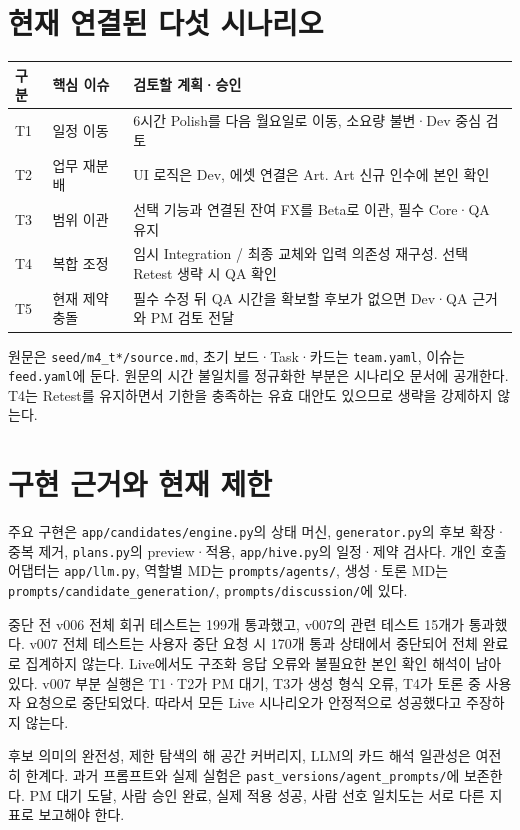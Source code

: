 \documentclass[11pt,a4paper]{article}
\begin{document}
\section{현재 연결된 다섯 시나리오}
\begin{tabularx}{\linewidth}{@{}p{13mm}p{30mm}Y@{}}\toprule
구분 & 핵심 이슈 & 검토할 계획·승인\\\midrule
T1 & 일정 이동 & 6시간 Polish를 다음 월요일로 이동, 소요량 불변·Dev 중심 검토\\
T2 & 업무 재분배 & UI 로직은 Dev, 에셋 연결은 Art. Art 신규 인수에 본인 확인\\
T3 & 범위 이관 & 선택 기능과 연결된 잔여 FX를 Beta로 이관, 필수 Core·QA 유지\\
T4 & 복합 조정 & 임시 Integration / 최종 교체와 입력 의존성 재구성. 선택 Retest 생략 시 QA 확인\\
T5 & 현재 제약 충돌 & 필수 수정 뒤 QA 시간을 확보할 후보가 없으면 Dev·QA 근거와 PM 검토 전달\\\bottomrule
\end{tabularx}
원문은 \texttt{seed/m4\_t*/source.md}, 초기 보드·Task·카드는 \texttt{team.yaml}, 이슈는 \texttt{feed.yaml}에 둔다. 원문의 시간 불일치를 정규화한 부분은 시나리오 문서에 공개한다. T4는 Retest를 유지하면서 기한을 충족하는 유효 대안도 있으므로 생략을 강제하지 않는다.

\section{구현 근거와 현재 제한}
주요 구현은 \texttt{app/candidates/engine.py}의 상태 머신, \texttt{generator.py}의 후보 확장·중복 제거, \texttt{plans.py}의 preview·적용, \texttt{app/hive.py}의 일정·제약 검사다. 개인 호출 어댑터는 \texttt{app/llm.py}, 역할별 MD는 \texttt{prompts/agents/}, 생성·토론 MD는 \texttt{prompts/candidate\_generation/}, \texttt{prompts/discussion/}에 있다.

중단 전 v006 전체 회귀 테스트는 199개 통과했고, v007의 관련 테스트 15개가 통과했다. v007 전체 테스트는 사용자 중단 요청 시 170개 통과 상태에서 중단되어 전체 완료로 집계하지 않는다. Live에서도 구조화 응답 오류와 불필요한 본인 확인 해석이 남아 있다. v007 부분 실행은 T1·T2가 PM 대기, T3가 생성 형식 오류, T4가 토론 중 사용자 요청으로 중단되었다. 따라서 모든 Live 시나리오가 안정적으로 성공했다고 주장하지 않는다.

후보 의미의 완전성, 제한 탐색의 해 공간 커버리지, LLM의 카드 해석 일관성은 여전히 한계다. 과거 프롬프트와 실제 실험은 \texttt{past\_versions/agent\_prompts/}에 보존한다. PM 대기 도달, 사람 승인 완료, 실제 적용 성공, 사람 선호 일치도는 서로 다른 지표로 보고해야 한다.
\end{document}
